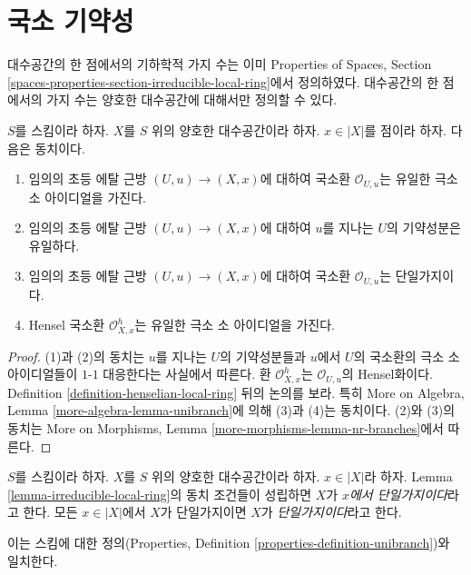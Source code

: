 \section{국소 기약성}
\label{section-irreducible-local-ring}

\noindent
대수공간의 한 점에서의 기하학적 가지 수는 이미 Properties of Spaces,
Section \ref{spaces-properties-section-irreducible-local-ring}에서
정의하였다. 대수공간의 한 점에서의 가지 수는 양호한 대수공간에
대해서만 정의할 수 있다.

\begin{lemma}
\label{lemma-irreducible-local-ring}
$S$를 스킴이라 하자. $X$를 $S$ 위의 양호한 대수공간이라 하자.
$x \in |X|$를 점이라 하자. 다음은 동치이다.
\begin{enumerate}
\item 임의의 초등 에탈 근방 $(U, u) \to (X, x)$에 대하여 국소환
$\mathcal{O}_{U, u}$는 유일한 극소 소 아이디얼을 가진다.
\item 임의의 초등 에탈 근방 $(U, u) \to (X, x)$에 대하여 $u$를
지나는 $U$의 기약성분은 유일하다.
\item 임의의 초등 에탈 근방 $(U, u) \to (X, x)$에 대하여 국소환
$\mathcal{O}_{U, u}$는 단일가지이다.
\item Hensel 국소환 $\mathcal{O}_{X, x}^h$는 유일한 극소 소
아이디얼을 가진다.
\end{enumerate}
\end{lemma}

\begin{proof}
(1)과 (2)의 동치는 $u$를 지나는 $U$의 기약성분들과 $u$에서 $U$의
국소환의 극소 소 아이디얼들이 $1$-$1$ 대응한다는 사실에서 따른다.
환 $\mathcal{O}_{X, x}^h$는 $\mathcal{O}_{U, u}$의 Hensel화이다.
Definition \ref{definition-henselian-local-ring} 뒤의 논의를 보라.
특히 More on Algebra, Lemma
\ref{more-algebra-lemma-unibranch}에 의해 (3)과 (4)는 동치이다.
(2)와 (3)의 동치는 More on Morphisms, Lemma
\ref{more-morphisms-lemma-nr-branches}에서 따른다.
\end{proof}

\begin{definition}
\label{definition-unibranch}
$S$를 스킴이라 하자. $X$를 $S$ 위의 양호한 대수공간이라 하자.
$x \in |X|$라 하자. Lemma \ref{lemma-irreducible-local-ring}의
동치 조건들이 성립하면 $X$가 {\it $x$에서 단일가지이다}라고 한다.
모든 $x \in |X|$에서 $X$가 단일가지이면 $X$가
{\it 단일가지이다}라고 한다.
\end{definition}

\noindent
이는 스킴에 대한 정의(Properties, Definition
\ref{properties-definition-unibranch})와 일치한다.


